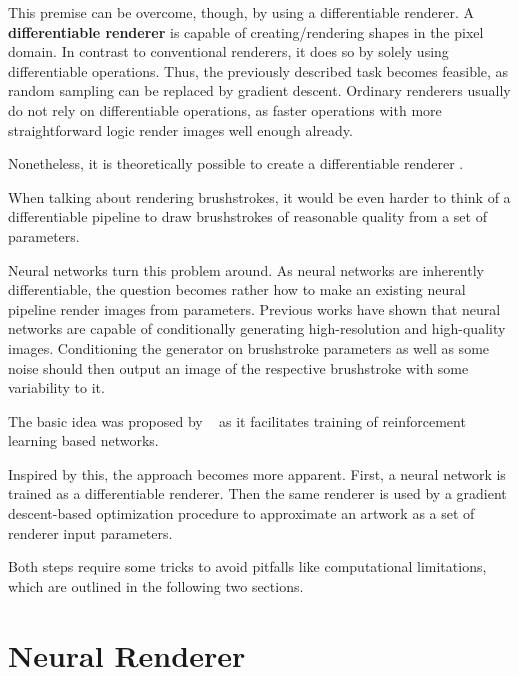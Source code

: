 This premise can be overcome, though, by using a differentiable renderer.
A \textbf{differentiable renderer} is capable of creating/rendering shapes in the pixel domain.
In contrast to conventional renderers, it does so by solely using differentiable operations.
Thus, the previously described task becomes feasible, as random sampling can be replaced by gradient descent.
Ordinary renderers usually do not rely on differentiable operations, as faster operations with more straightforward logic render images well enough already.

Nonetheless, it is theoretically possible to create a differentiable renderer \cite{something}.

When talking about rendering brushstrokes, it would be even harder to think of a differentiable pipeline to draw brushstrokes of reasonable quality from a set of parameters.

Neural networks turn this problem around.
As neural networks are inherently differentiable, the question becomes rather how to make an existing neural pipeline render images from parameters.
Previous works have shown that neural networks are capable of conditionally generating high-resolution and high-quality images.
Conditioning the generator on brushstroke parameters as well as some noise should then output an image of the respective brushstroke with some variability to it.

The basic idea was proposed by \citeauthor*{japaneseneuralrenderer}~\cite{japaneseneuralrenderer} as it facilitates training of reinforcement learning based networks.

Inspired by this, the approach becomes more apparent.
First, a neural network is trained as a differentiable renderer.
Then the same renderer is used by a gradient descent-based optimization procedure to approximate an artwork as a set of renderer input parameters.

Both steps require some tricks to avoid pitfalls like computational limitations, which are outlined in the following two sections.


\section{Neural Renderer}

